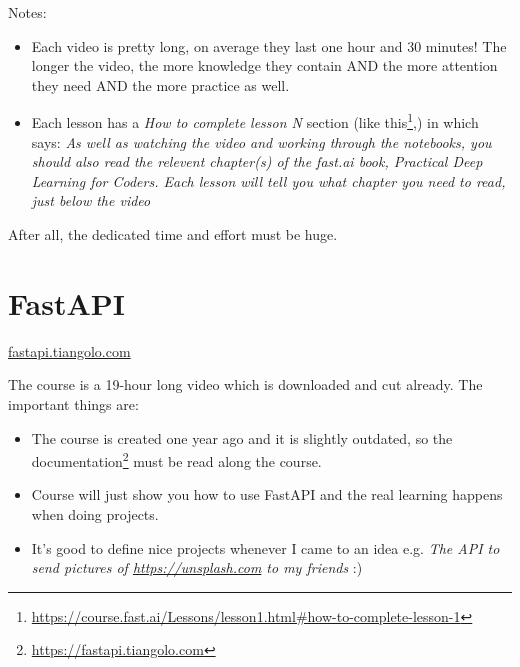 		\clearpage
		
		\noindent Notes:
		\begin{itemize}
			\item Each video is pretty long, on average they last one hour and 30 minutes! The longer the video, the more knowledge they contain AND the more attention they need AND the more practice as well.
			
			\item Each lesson has a \textit{How to complete lesson N} section (like this\footnote{\url{https://course.fast.ai/Lessons/lesson1.html\#how-to-complete-lesson-1}},) in which says: \textit{As well as watching the video and working through the notebooks, you should also read the relevent chapter(s) of the fast.ai book, Practical Deep Learning for Coders. Each lesson will tell you what chapter you need to read, just below the video}
		\end{itemize}
		
		After all, \textsf{the dedicated time and effort must be huge.}
		
		\clearpage
		\section{FastAPI}
		\epigraph{
			\begin{sansserif}
			\end{sansserif}	
		}{\url{fastapi.tiangolo.com}}
		
		\begin{inparadesc}
			\item \easy
			\item \shortvideo
			\item \many
		\end{inparadesc}
		\vspace{3mm}
		
		
		\noindent The course is a 19-hour long video which is downloaded and cut already. The important things are:
		\begin{itemize}
			\item The course is created one year ago and it is slightly outdated, so the documentation\footnote{\url{https://fastapi.tiangolo.com}} must be read along the course.
			
			\item Course will just show you how to use FastAPI and the real learning happens when doing projects.
			
			\item It's good to define nice projects whenever I came to an idea
			e.g. \textit{The API to send pictures of \url{https://unsplash.com} to my friends} :)
		\end{itemize}
		
